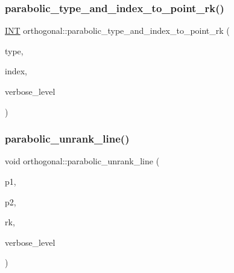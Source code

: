 \subsubsection{\texorpdfstring{parabolic\+\_\+type\+\_\+and\+\_\+index\+\_\+to\+\_\+point\+\_\+rk()}{parabolic\_type\_and\_index\_to\_point\_rk()}}
{\footnotesize\ttfamily \mbox{\hyperlink{galois_8h_a09fddde158a3a20bd2dcadb609de11dc}{I\+NT}} orthogonal\+::parabolic\+\_\+type\+\_\+and\+\_\+index\+\_\+to\+\_\+point\+\_\+rk (\begin{DoxyParamCaption}\item[{\mbox{\hyperlink{galois_8h_a09fddde158a3a20bd2dcadb609de11dc}{I\+NT}}}]{type,  }\item[{\mbox{\hyperlink{galois_8h_a09fddde158a3a20bd2dcadb609de11dc}{I\+NT}}}]{index,  }\item[{\mbox{\hyperlink{galois_8h_a09fddde158a3a20bd2dcadb609de11dc}{I\+NT}}}]{verbose\+\_\+level }\end{DoxyParamCaption})}

\mbox{\label{classorthogonal_a449cc51a62e11b8699befe951b0f8a4c}} 
\subsubsection{\texorpdfstring{parabolic\+\_\+unrank\+\_\+line()}{parabolic\_unrank\_line()}}
{\footnotesize\ttfamily void orthogonal\+::parabolic\+\_\+unrank\+\_\+line (\begin{DoxyParamCaption}\item[{\mbox{\hyperlink{galois_8h_a09fddde158a3a20bd2dcadb609de11dc}{I\+NT}} \&}]{p1,  }\item[{\mbox{\hyperlink{galois_8h_a09fddde158a3a20bd2dcadb609de11dc}{I\+NT}} \&}]{p2,  }\item[{\mbox{\hyperlink{galois_8h_a09fddde158a3a20bd2dcadb609de11dc}{I\+NT}}}]{rk,  }\item[{\mbox{\hyperlink{galois_8h_a09fddde158a3a20bd2dcadb609de11dc}{I\+NT}}}]{verbose\+\_\+level }\end{DoxyParamCaption})}

\mbox{\label{classorthogonal_a83a57c7023d5a61881d39f00f7717d8b}} 
